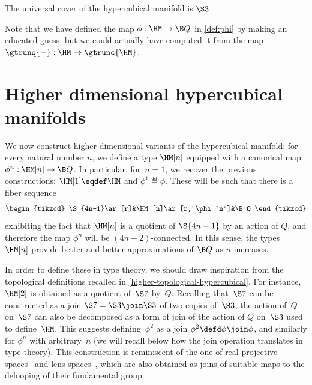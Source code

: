 \documentclass[a4paper]{article}
\newcommand{\citep}{\cite}
\begin{document}
\begin{theorem}
  The universal cover of the hypercubical manifold is $\S3$.
\end{theorem}

\noindent
Note that we have defined the map $\phi:\HM\to\B Q$ in \cref{def:phi} by making an educated guess, but we could actually have computed it from the map $\gtrunq{{-}}:\HM\to\gtrunc{\HM}$.

\section{Higher dimensional hypercubical manifolds}
\label{higher}
We now construct higher dimensional variants of the hypercubical manifold: for every natural number $n$, we define a type $\HM[n]$ equipped with a canonical map $\phi^n:\HM[n]\to\B Q$. In particular, for~$n=1$, we recover the previous constructions: $\HM[1]\eqdef\HM$ and $\phi^1\eqdef\phi$. These will be such that there is a fiber sequence
\[
  \begin{tikzcd}
    \S{4n-1}\ar[r]&\HM[n]\ar[r,"\phi^n"]&\B Q
  \end{tikzcd}
\]
exhibiting the fact that $\HM[n]$ is a quotient of $\S{4n-1}$ by an action of $Q$, and therefore the map $\phi^n$ will be $(4n{-}2)$-connected. In this sense, the types $\HM[n]$ provide better and better approximations of $\B Q$ as $n$ increases.

In order to define these in type theory, we should draw inspiration from the topological definitions recalled in \cref{higher-topological-hypercubical}. For instance, $\HM[2]$ is obtained as a quotient of~$\S7$ by~$Q$. Recalling that~$\S7$ can be constructed as a join $\S7=\S3\join\S3$ of two copies of~$\S3$, the action of~$Q$ on~$\S7$ can also be decomposed as a form of join of the action of $Q$ on~$\S3$ used to define~$\HM$. This suggests defining~$\phi^2$ as a join $\phi^2\defd\phi\join\phi$, and similarly for $\phi^n$ with arbitrary~$n$ (we will recall below how the join operation translates in type theory).
%
This construction is reminiscent of the one of real projective spaces~\citep{buchholtz2017real} and lens spaces~\citep{lens}, which are also obtained as joins of suitable maps to the delooping of their fundamental group.
\end{document}
